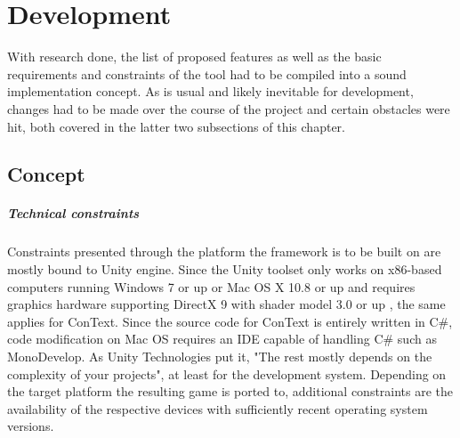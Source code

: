 
\chapter{Development}\label{chapter:development}
With research done, the list of proposed features as well as the basic requirements and constraints of the tool had to be compiled into a sound implementation concept. As is usual and likely inevitable for development, changes had to be made over the course of the project and certain obstacles were hit, both covered in the latter two subsections of this chapter.

\section{Concept}
\paragraph{Technical constraints} Constraints presented through the platform the framework is to be built on are mostly bound to Unity engine. Since the Unity toolset only works on x86-based computers running Windows 7 or up or Mac OS X 10.8 or up and requires graphics hardware supporting DirectX 9 with shader model 3.0 or up \cite{SREQ}, the same applies for ConText. Since the source code for ConText is entirely written in C\#, code modification on Mac OS requires an IDE capable of handling C\# such as MonoDevelop. As Unity Technologies put it, "The rest mostly depends on the complexity of your projects", at least for the development system. Depending on the target platform the resulting game is ported to, additional constraints are the availability of the respective devices with sufficiently recent operating system versions.
